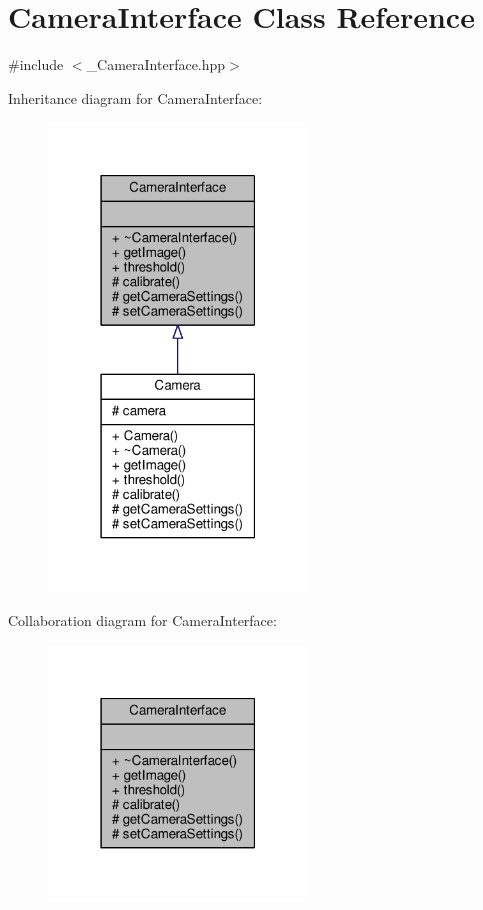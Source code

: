 \hypertarget{class_camera_interface}{}\section{Camera\+Interface Class Reference}
\label{class_camera_interface}


{\ttfamily \#include $<$\+\_\+\+Camera\+Interface.\+hpp$>$}



Inheritance diagram for Camera\+Interface\+:\nopagebreak
\begin{figure}[H]
\begin{center}
\leavevmode
\includegraphics[width=195pt]{class_camera_interface__inherit__graph}
\end{center}
\end{figure}


Collaboration diagram for Camera\+Interface\+:\nopagebreak
\begin{figure}[H]
\begin{center}
\leavevmode
\includegraphics[width=195pt]{class_camera_interface__coll__graph}
\end{center}
\end{figure}
